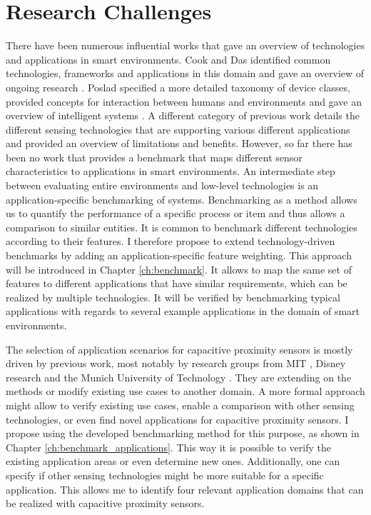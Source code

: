 \section{Research Challenges}
There have been numerous influential works that gave an overview of technologies and applications in smart environments. Cook and Das identified common technologies, frameworks and applications in this domain and gave an overview of ongoing research \cite{cook2007smart}. Poslad specified a more detailed taxonomy of device classes, provided concepts for interaction between humans and environments and gave an overview of intelligent systems \cite{poslad2011ubiquitous}. A different category of previous work details the different sensing technologies that are supporting various different applications and provided an overview of limitations and benefits. However, so far there has been no work that provides a benchmark that maps different sensor characteristics to applications in smart environments. An intermediate step between evaluating entire environments and low-level technologies is an application-specific benchmarking of systems. Benchmarking as a method allows us to quantify the performance of a specific process or item and thus allows a comparison to similar entities. It is common to benchmark different technologies according to their features. I therefore propose to extend technology-driven benchmarks by adding an application-specific feature weighting. This approach will be introduced in Chapter \ref{ch:benchmark}. It allows to map the same set of features to different applications that have similar requirements, which can be realized by multiple technologies. It will be verified by benchmarking typical applications with regards to several example applications in the domain of smart environments.

The selection of application scenarios for capacitive proximity sensors is mostly driven by previous work, most notably by research groups from MIT \cite{Zimmerman1995}, Disney research \cite{Sato2012} and the Munich University of Technology \cite{Wimmer2006}. They are extending on the methods or modify existing use cases to another domain. A more formal approach might allow to verify existing use cases, enable a comparison with other sensing technologies, or even find novel applications for capacitive proximity sensors. I propose using the developed benchmarking method for this purpose, as shown in Chapter \ref{ch:benchmark_applications}. This way it is possible to verify the existing application areas or even determine new ones. Additionally, one can specify if other sensing technologies might be more suitable for a specific application. This allows me to identify four relevant application domains that can be realized with capacitive proximity sensors. 

